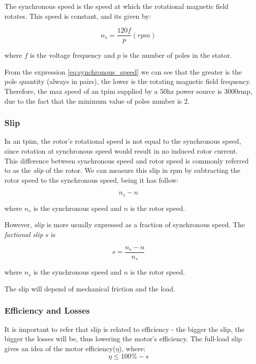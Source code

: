 The synchronous speed is the speed at which the rotational magnetic field rotates. This speed is constant, and its given by:

\begin{equation} \label{eq:synchronous_speed}
	 n_{s} = \frac{120f}{p}(rpm)
\end{equation}

where $f$ is the voltage frequency and $p$ is the number of poles in the stator.

From the expression \ref{eq:synchronous_speed} we can see that the greater is the pole quantity (always in pairs), the lower is the rotating magnetic field frequency.
Therefore, the max speed of an \acrshort{tpim} supplied by a 50hz power source is 3000rmp, due to the fact that the minimum value of poles number is 2.


\subsubsection{Slip}
In an \acrshort{tpim}, the rotor's rotational speed is not equal to the synchronous speed, since rotation at synchronous speed would result in no induced rotor current. This difference between synchronous speed and rotor speed is commonly referred to as the \emph{slip} of the rotor. We can measure this slip in rpm by subtracting the rotor speed to the synchronous speed, being it has follow:

\begin{equation} \label{eq:slip}
	 n_{s} - n
\end{equation}

where $n_{s}$ is the synchronous speed and $n$ is the rotor speed.

However, \emph{slip} is more usually expressed as a fraction of synchronous speed. The \emph{factional slip} $s$ is

\begin{equation} \label{eq:perc_slip}
	s = \frac{n_{s} - n}{n_{s}} 
\end{equation}

where $n_{s}$ is the synchronous speed and $n$ is the rotor speed.

The slip will depend of mechanical friction and the load.

\subsubsection{Efficiency and Losses}

It is important to refer that slip is related to efficiency - the bigger the slip, the bigger the losses will be, thus lowering the motor's efficiency. The full-load slip gives an idea of the motor efficiency($\eta$), where:
\begin{equation} \label{eq:efficiency_max}
	\eta \leqslant 100\% - s
\end{equation}

